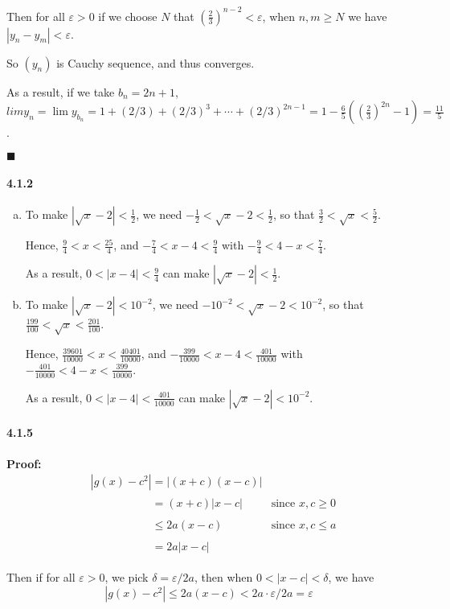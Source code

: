 \documentclass[11pt]{article}
\newcommand{\qed}{
	\begin{flushright}
		$\blacksquare$
	\end{flushright}}
\begin{document}
	Then for all $\varepsilon > 0$ if we choose $N$ that $(\frac{2}{3})^{n - 2} < \varepsilon$, when $n, m \geq N$ we have $|y_n - y_m| < \varepsilon$.
	
	So $(y_n)$ is Cauchy sequence, and thus converges.
	
	As a result, if we take $b_n = 2n + 1$, $lim y_n = \lim y_{b_n} = 1 + (2/3) + (2/3)^3 + \cdots + (2/3)^{2n - 1} = 1 - \frac{6}{5}((\frac{2}{3})^{2n} - 1) = \frac{11}{5}$.
	\qed
	
	\paragraph{4.1.2}
		\begin{enumerate}[(a)]
			\item To make $|\sqrt{x} - 2| < \frac{1}{2}$, we need $-\frac{1}{2} < \sqrt{x} - 2 < \frac{1}{2}$, so that $\frac{3}{2} < \sqrt{x} < \frac{5}{2}$.
			
			Hence, $\frac{9}{4} < x < \frac{25}{4}$, and $-\frac{7}{4} < x - 4 < \frac{9}{4}$ with $-\frac{9}{4} < 4 - x < \frac{7}{4}$.
			
			As a result, $0 < |x - 4| < \frac{9}{4}$ can make $|\sqrt{x} - 2| < \frac{1}{2}$.
			\item To make $|\sqrt{x} - 2| < 10^{-2}$, we need $-10^{-2} < \sqrt{x} - 2 < 10^{-2}$, so that $\frac{199}{100} < \sqrt{x} < \frac{201}{100}$.
			
			Hence, $\frac{39601}{10000} < x < \frac{40401}{10000}$, and $-\frac{399}{10000} < x - 4 < \frac{401}{10000}$ with $-\frac{401}{10000} < 4 - x < \frac{399}{10000}$.
			
			As a result, $0 < |x - 4| < \frac{401}{10000}$ can make $|\sqrt{x} - 2| < 10^{-2}$.
		\end{enumerate}
	\paragraph{4.1.5}\textbf{Proof:}
		\begin{align}
			&|g(x) - c^2| = |(x + c)(x - c)|\nonumber\\
			&\phantom{|g(x) - c^2|} = (x + c)|x - c|&\text{since }x, c \geq 0\nonumber\\
			&\phantom{|g(x) - c^2|} \leq 2a(x - c)&\text{since }x, c \leq a\nonumber\\
			&\phantom{|g(x) - c^2|} = 2a|x - c|\nonumber
		\end{align}
		
		Then if for all $\varepsilon > 0$, we pick $\delta = \varepsilon / 2a$, then when $0 < |x - c| < \delta$, we have
		\[|g(x) - c^2| \leq 2a(x - c) < 2a \cdot \varepsilon / 2a = \varepsilon\]
		
\end{document}
